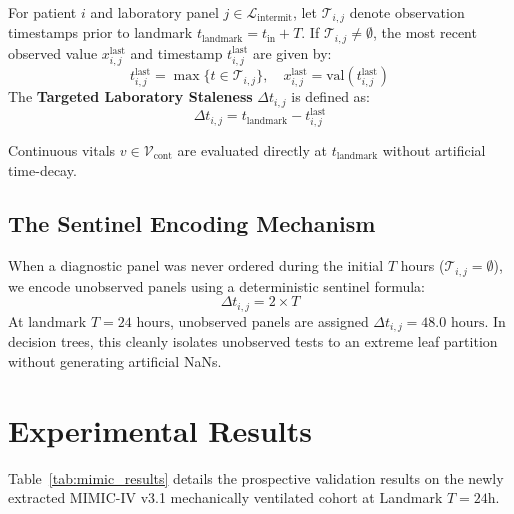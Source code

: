 \documentclass[journal]{IEEEtran}
\begin{document}
For patient $i$ and laboratory panel $j \in \mathcal{L}_{\text{intermit}}$, let $\mathcal{T}_{i,j}$ denote observation timestamps prior to landmark $t_{\text{landmark}} = t_{\text{in}} + T$. If $\mathcal{T}_{i,j} \ne \emptyset$, the most recent observed value $x_{i,j}^{\text{last}}$ and timestamp $t_{i,j}^{\text{last}}$ are given by:
\begin{equation}
t_{i,j}^{\text{last}} = \max \{t \in \mathcal{T}_{i,j}\}, \quad x_{i,j}^{\text{last}} = \text{val}(t_{i,j}^{\text{last}})
\end{equation}
The \textbf{Targeted Laboratory Staleness} $\Delta t_{i,j}$ is defined as:
\begin{equation}
\Delta t_{i,j} = t_{\text{landmark}} - t_{i,j}^{\text{last}}
\end{equation}

Continuous vitals $v \in \mathcal{V}_{\text{cont}}$ are evaluated directly at $t_{\text{landmark}}$ without artificial time-decay.

\subsection{The Sentinel Encoding Mechanism}
When a diagnostic panel was never ordered during the initial $T$ hours ($\mathcal{T}_{i,j} = \emptyset$), we encode unobserved panels using a deterministic sentinel formula:
\begin{equation}
\Delta t_{i,j} = 2 \times T
\end{equation}
At landmark $T = 24\text{ hours}$, unobserved panels are assigned $\Delta t_{i,j} = 48.0\text{ hours}$. In decision trees, this cleanly isolates unobserved tests to an extreme leaf partition without generating artificial NaNs.

\section{Experimental Results}
Table~\ref{tab:mimic_results} details the prospective validation results on the newly extracted MIMIC-IV v3.1 mechanically ventilated cohort at Landmark $T = 24\text{h}$.
\end{document}
